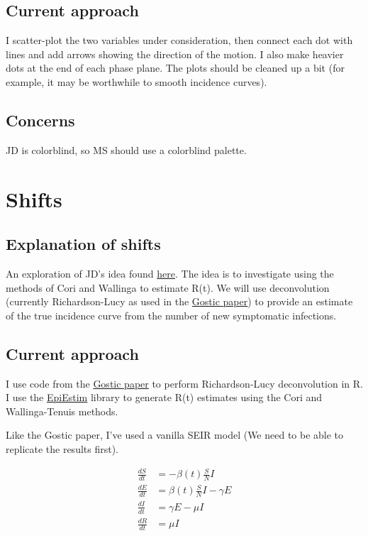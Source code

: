 \documentclass{article}
\begin{document}
\subsection{Current approach}
I scatter-plot the two variables under consideration, then connect each dot with lines and add arrows showing the direction of the motion. I also make heavier dots at the end of each phase plane. The plots should be cleaned up a bit (for example, it may be worthwhile to smooth incidence curves).

\subsection{Concerns}
JD is colorblind, so MS should use a colorblind palette.


\section{Shifts}
\subsection{Explanation of shifts}
An exploration of JD's idea found  \href{http://dushoff.github.io/notebook/shifts.html}{here}. The idea is to investigate using the methods of Cori and Wallinga to estimate R(t). We will use deconvolution (currently Richardson-Lucy as used in the \href{https://www.medrxiv.org/content/10.1101/2020.06.18.20134858v3}{Gostic paper}) to provide an estimate of the true incidence curve from the number of new symptomatic infections. 

\subsection{Current approach}
I use code from the \href{https://github.com/cobeylab/Rt_estimation}{Gostic paper} to perform Richardson-Lucy deconvolution in R. I use the \href{https://cran.r-project.org/web/packages/EpiEstim/index.html}{EpiEstim} library to generate R(t) estimates using the Cori and Wallinga-Tenuis methods. 

Like the Gostic paper, I've used a vanilla SEIR model (We need to be able to replicate the results first).

\begin{align}
\frac{dS}{dt} &= -\beta(t) \frac{S}{N}  I \\ 
\frac{dE}{dt} &= \beta(t) \frac{S}{N} I - \gamma E \\
\frac{dI}{dt} &= \gamma E - \mu I \\ 
\frac{dR}{dt} &= \mu I  
\end{align}
\end{document}
